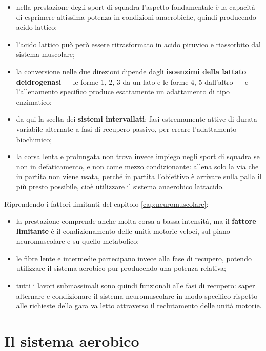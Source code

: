\begin{itemize}
  \item nella prestazione degli sport di squadra l'aspetto fondamentale è la capacità di esprimere
    altissima potenza in condizioni anaerobiche, quindi producendo acido lattico;
  \item l'acido lattico può però essere ritrasformato in acido piruvico e riassorbito dal sistema
    muscolare;
  \item la conversione nelle due direzioni dipende dagli \textbf{isoenzimi della lattato
    deidrogenasi} --- le forme 1, 2, 3 da un lato e le forme 4, 5 dall'altro --- e l'allenamento
    specifico produce esattamente un adattamento di tipo enzimatico;
  \item da qui la scelta dei \textbf{sistemi intervallati}: fasi estremamente attive di durata
    variabile alternate a fasi di recupero passivo, per creare l'adattamento biochimico;
  \item la corsa lenta e prolungata non trova invece impiego negli sport di squadra se non in
    defaticamento, e non come mezzo condizionante: allena solo la via che in partita non viene
    usata, perché in partita l'obiettivo è arrivare sulla palla il più presto possibile, cioè
    utilizzare il sistema anaerobico lattacido.
\end{itemize}

Riprendendo i fattori limitanti del capitolo \ref{cap:neuromuscolare}:
\begin{itemize}
  \item la prestazione comprende anche molta corsa a bassa intensità, ma il \textbf{fattore
    limitante} è il condizionamento delle unità motorie veloci, sul piano neuromuscolare e su quello
    metabolico;
  \item le fibre lente e intermedie partecipano invece alla fase di recupero, potendo utilizzare il
    sistema aerobico pur producendo una potenza relativa;
  \item tutti i lavori submassimali sono quindi funzionali alle fasi di recupero: saper alternare e
    condizionare il sistema neuromuscolare in modo specifico rispetto alle richieste della gara va
    letto attraverso il reclutamento delle unità motorie.
\end{itemize}

\section{Il sistema aerobico}

